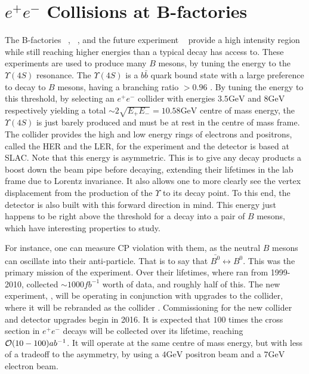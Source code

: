 \section{$e^+ e^-$ Collisions at B-factories}
\label{sec:ee_experiment}
The B-factories \babar~\cite{Boutigny:1995ib}, \belle~\cite{Cheng:1995im}, and the future experiment \belletwo~\cite{Abe:2010gxa} provide a high intensity region while still reaching higher energies than a typical decay has access to.
These experiments are used to produce many $B$ mesons, by tuning the energy to the $\Upsilon(4S)$ resonance.
The $\Upsilon(4S)$ is a $b\bar{b}$ quark bound state with a large preference to decay to $B$ mesons, having a branching ratio $> 0.96$ \cite{Agashe:2014kda}.
By tuning the energy to this threshold, by selecting an $e^+ e^-$ collider with energies $3.5\textrm{GeV}$ and $8\textrm{GeV}$ respectively yielding a total $\sim 2\sqrt{E_+ E_-} = 10.58\textrm{GeV}$ centre of mass energy, the $\Upsilon(4S)$ is just barely produced and must be at rest in the centre of mass frame.
The \kekb collider provides the high and low energy rings of electrons and positrons, called the HER and the LER, for the \belle experiment and the \babar detector is based at SLAC.
Note that this energy is asymmetric.
This is to give any decay products a boost down the beam pipe before decaying, extending their lifetimes in the lab frame due to Lorentz invariance.
It also allows one to more clearly see the vertex displacement from the production of the $\Upsilon$ to its decay point.
To this end, the detector is also built with this forward direction in mind.
This energy just happens to be right above the threshold for a decay into a pair of $B$ mesons, which have interesting properties to study.

For instance, one can measure CP violation with them, as the neutral $B$ mesons can oscillate into their anti-particle.
That is to say that $\bar{B^0} \leftrightarrow B^0$.
This was the primary mission of the \babar experiment.
Over their lifetimes, where \belle ran from 1999-2010, \belle collected $\sim 1000fb^{-1}$ worth of data, and \babar roughly half of this.
The new experiment, \belletwo, will be operating in conjunction with upgrades to the \kekb collider, where it will be rebranded as the \superkekb collider \cite{Akeroyd:2004mj}.
Commissioning for the new collider and detector upgrades begin in 2016.
It is expected that $100$ times the cross section in $e^+ e^-$ decays will be collected over its lifetime, reaching $\operatorname{\mathcal{O}}(10-100)ab^{-1}$.
It will operate at the same centre of mass energy, but with less of a tradeoff to the asymmetry, by using a $4\textrm{GeV}$ positron beam and a $7\textrm{GeV}$ electron beam.

